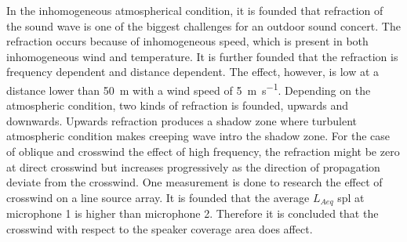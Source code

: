 In the inhomogeneous atmospherical condition, it is founded that refraction of the sound wave is one of the biggest challenges for an outdoor sound concert. The refraction occurs because of inhomogeneous speed, which is present in both inhomogeneous wind and temperature. It is further founded that the refraction is frequency dependent and distance dependent. The effect, however, is low at a distance lower than \SI{50}{\meter} with a wind speed of \SI{5}{\meter\per\second}. Depending on the atmospheric condition, two kinds of refraction is founded, upwards and downwards. Upwards refraction produces a shadow zone where turbulent atmospheric condition makes creeping wave intro the shadow zone. For the case of oblique and crosswind the effect of high frequency, the refraction might be zero at direct crosswind but increases progressively as the direction of propagation deviate from the crosswind. One measurement is done to research the effect of crosswind on a line source array. It is founded that the average $L_{Aeq}$ \gls{spl} at microphone 1 is  higher than microphone 2. Therefore it is concluded that the crosswind with respect to the speaker coverage area does affect. 

